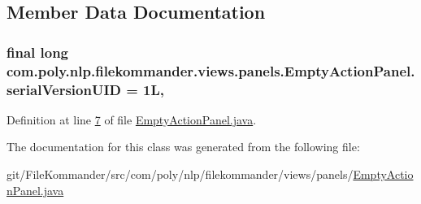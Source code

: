 \subsection{Member Data Documentation}
\hypertarget{classcom_1_1poly_1_1nlp_1_1filekommander_1_1views_1_1panels_1_1_empty_action_panel_af3e816340607acb519bf84c35b7f2d04}{
\subsubsection[{serial\-Version\-U\-I\-D}]{\setlength{\rightskip}{0pt plus 5cm}final long com.\-poly.\-nlp.\-filekommander.\-views.\-panels.\-Empty\-Action\-Panel.\-serial\-Version\-U\-I\-D = 1\-L\hspace{0.3cm}{\ttfamily [static]}, {\ttfamily [private]}}}\label{classcom_1_1poly_1_1nlp_1_1filekommander_1_1views_1_1panels_1_1_empty_action_panel_af3e816340607acb519bf84c35b7f2d04}


Definition at line \hyperlink{L7}{7} of file \hyperlink{}{Empty\-Action\-Panel.\-java}.



The documentation for this class was generated from the following file\-:\begin{DoxyCompactItemize}
\item 
git/\-File\-Kommander/src/com/poly/nlp/filekommander/views/panels/\hyperlink{_empty_action_panel_8java}{Empty\-Action\-Panel.\-java}\end{DoxyCompactItemize}
